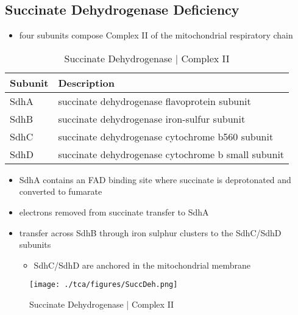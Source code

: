 \documentclass{scrartcl}
\begin{document}
\subsection{Succinate Dehydrogenase Deficiency}
\label{sec:orgb56e3a6}
\begin{itemize}
\item four subunits compose Complex II of the mitochondrial respiratory chain
\end{itemize}

\begin{table}[htbp]
\caption{\label{tab:orgd7cf753}
Succinate Dehydrogenase | Complex II}
\centering
\begin{tabular}{ll}
Subunit & Description\\
\hline
SdhA & succinate dehydrogenase flavoprotein subunit\\
SdhB & succinate dehydrogenase iron-sulfur subunit\\
SdhC & succinate dehydrogenase cytochrome b560 subunit\\
SdhD & succinate dehydrogenase cytochrome b small subunit\\
\end{tabular}
\end{table}

\begin{itemize}
\item SdhA contains an FAD binding site where succinate is deprotonated
and converted to fumarate
\end{itemize}


\begin{itemize}
\item electrons removed from succinate transfer to SdhA
\item transfer across SdhB through iron sulphur clusters to the SdhC/SdhD subunits
\begin{itemize}
\item SdhC/SdhD are anchored in the mitochondrial membrane
\end{itemize}
\end{itemize}

\begin{figure}[htbp]
\centering
\texttt{[image: ./tca/figures/SuccDeh.png]}
\caption{\label{fig:orga97e412}
Succinate Dehydrogenase | Complex II}
\end{figure}
\end{document}
